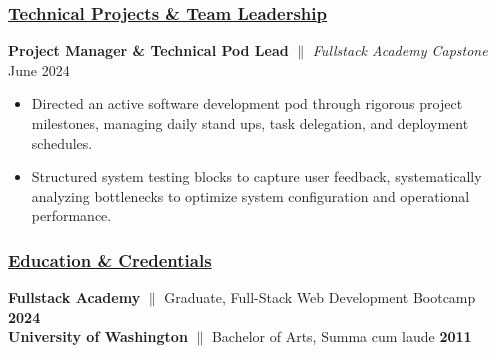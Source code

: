 \documentclass[a4paper,10pt]{article}
\begin{document}
\subsubsection{\underline{Technical Projects \& Team Leadership}}

{\textbf{Project Manager \& Technical Pod Lead} $\parallel$ \textit{Fullstack Academy Capstone} \hfill {June 2024}}
\begin{itemize}
      \item Directed an active software development pod through rigorous project milestones, managing daily stand ups, task delegation, and deployment schedules.
      \item Structured system testing blocks to capture user feedback, systematically analyzing bottlenecks to optimize system configuration and operational performance.
\end{itemize}

\subsubsection{\underline{Education \& Credentials}}
\textbf{Fullstack Academy} $\parallel$ Graduate, Full-Stack Web Development Bootcamp \hfill \textbf{2024} \\
\textbf{University of Washington} $\parallel$ Bachelor of Arts, Summa cum laude \hfill \textbf{2011}
\end{document}
